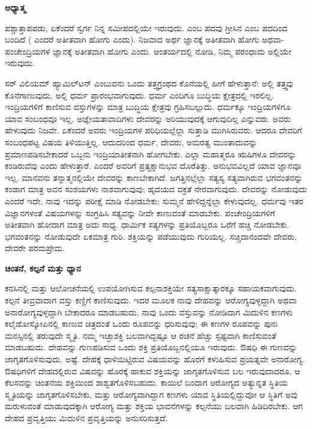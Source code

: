 \centerline{\textbf{ಅಧ್ಯಾತ್ಮ}}

ಪಶ್ಚಾತ್ತಾಪಪಡು, ಏಕೆಂದರೆ ಸ್ವರ್ಗ ನಿನ್ನ ಸಮೀಪದಲ್ಲಿಯೇ ಇರುವುದು.  ಎಂಬ ಪದವು ಗ್ರೀಸಿನ  ಎಂಬ ಪದದಿಂದ ಬಂದಿದೆ ( ಎಂದರೆ ಅತೀತವಾಗಿ ಹೋಗು ಎಂದು). ನಿಜವಾದ ಅರ್ಥ ಜ್ಞಾನಕ್ಕೆ ಅತೀತವಾಗಿ ಹೋಗು ಅಥವಾ-ಪಂಚೇಂದ್ರಿಯಗಳ ಜ್ಞಾನಕ್ಕೆ ಅತೀತವಾಗಿ ಹೋಗು ಎಂದು. ಆಂತರ್ಯದಲ್ಲಿ ನೋಡಿ, ನಿಮ್ಮ ಪರಂಧಾಮ ಅಲ್ಲಿಯೇ ಇರುವುದು.

\vskip 0.2cm

ಸರ್​ ವಿಲಿಯಮ್​ ಹ್ಯಾಮಿಲ್​ಟನ್​ ಎಂಬುವನು ಒಂದು ತತ್ತ್ವಗ್ರಂಥದ ಕೊನೆಯಲ್ಲಿ ಹೀಗೆ ಹೇಳುತ್ತಾನೆ: ಅಲ್ಲಿ ತತ್ತ್ವವು ಕೊನೆಗಾಣುವುದು, ಅಲ್ಲಿ ಧರ್ಮ ಪ್ರಾರಂಭವಾಗುವುದು. ಧರ್ಮ ಎಂದಿಗೂ ಬುದ್ಧಿಯ ಕ್ಷೇತ್ರದಲ್ಲಿ ಇರಲಿಲ್ಲ. ಇಂದ್ರಿಯಗಳಿಗೆ ಕಾಣಿಸುವ ವಸ್ತುಗಳನ್ನು ಮಾತ್ರ ಬುದ್ಧಿಯ ಕ್ಷೇತ್ರವು ಗ್ರಹಿಸಬಲ್ಲುದು. ಧರ್ಮಕ್ಕೂ ಇಂದ್ರಿಯಗಳಿಗೂ ಯಾವ ಸಂಬಂಧವೂ ಇಲ್ಲ. ಅಜ್ಞೇಯತಾವಾದಿಗಳು ದೇವರನ್ನು ಅರಿಯುವುದಕ್ಕೆ ಆಗುವುದಿಲ್ಲ ಎನ್ನುವರು. ಅವರು ಹೇಳುವುದು ನಿಜವೇ. ಏಕೆಂದರೆ ಅವರು ಇಂದ್ರಿಯಗಳ ಪರಿಧಿಯಲ್ಲೆಲ್ಲಾ ಸುತ್ತಾಡಿ ಮುಗಿಸಿರುವರು. ಆದರೂ ದೇವರಿಗೆ ಸಂಬಂಧಪಟ್ಟ ವಿಷಯ ತಿಳಿಯುತ್ತಿಲ್ಲ. ಆದುದರಿಂದ ಧರ್ಮ, ದೇವರು, ಅಮರತ್ವ ಮುಂತಾದುವನ್ನು ಪ್ರಮಾಣಪಡಿಸಬೇಕಾದರೆ ಒಬ್ಬನು ಇಂದ್ರಿಯಾತೀತನಾಗಿ ಹೋಗಬೇಕು. ಎಲ್ಲಾ ಮಹಾತ್ಮರೂ ಋಷಿಗಳೂ ದೇವರನ್ನು ಕಂಡಿರುವೆವು ಎಂದು ಹೇಳುತ್ತಾರೆ. ಎಂದರೆ ಅವರಿಗೆ ಪ್ರತ್ಯಕ್ಷಾನುಭವ ದೊರೆತಿತ್ತು. ಅನುಭವವಿಲ್ಲದೆ ಯಾವ ಜ್ಞಾನವೂ ಇಲ್ಲ. ಮಾನವನು ತನ್ನಾತ್ಮನಲ್ಲಿಯೇ ದೇವರನ್ನು ಕಾಣಬೇಕಾಗಿದೆ. ಜಗತ್ತಿನಲ್ಲೆಲ್ಲಾ ಸತ್ಯಸ್ಯ ಸತ್ಯವಾಗಿರುವ ಭಗವಂತನನ್ನು ಕಂಡಾಗ ಮಾತ್ರ ಅವನ ಸಂಶಯಗಳು ನಾಶವಾಗುವುವು; ಹೃದಯದ ವಕ್ರತೆ ನೇರವಾಗುವುದು. ದೇವರನ್ನು ನೋಡುವುದು ಎಂದರೆ ಇದೇ. ನಾವು ಇದನ್ನು ಪರೀಕ್ಷೆ ಮಾಡಿ ನೋಡಬೇಕು; ಸುಮ್ಮನೆ ಹೇಳಿದ್ದನ್ನೆಲ್ಲಾ ಕೇಳುವುದಲ್ಲ. ಧರ್ಮವು ಇತರ ವಿಜ್ಞಾನಗಳಂತೆ ವಿಷಯಗಳನ್ನು ಸಂಗ್ರಹಿಸಿ ಸತ್ಯವನ್ನು ನೀವೇ ಕಾಣುವಂತೆ ಮಾಡಬೇಕು. ಪಂಚೇಂದ್ರಿಯಗಳಿಗೆ ಅತೀತವಾಗಿ ಹೋದಾಗ ಮಾತ್ರ ಅದು ಸಾಧ್ಯ. ಧಾರ್ಮಿಕ ಸತ್ಯಗಳನ್ನು ಪ್ರತಿಯೊಬ್ಬರೂ ಒರೆಗೆ ಹಚ್ಚಿ ನೋಡಬೇಕು. ಭಗವಂತನನ್ನು ನೋಡುವುದೇ ಏಕಮಾತ್ರ ಗುರಿ. ಶಕ್ತಿಯನ್ನು ಪಡೆಯುವುದು ಗುರಿಯಲ್ಲ. ಸಚ್ಚಿದಾನಂದವೇ ದೇವರು, ದೇವರೇ ಪರಮಪ್ರೇಮ.

\centerline{\textbf{ಚಿಂತನೆ, ಕಲ್ಪನೆ ಮತ್ತು ಧ್ಯಾನ}}

ಕನಸಿನಲ್ಲಿ ಮತ್ತು ಆಲೋಚನೆಯಲ್ಲಿ ಉಪಯೋಗಿಸುವ ಕಲ್ಪನಾಶಕ್ತಿಯೇ ಸತ್ಯ\break ಸಾಕ್ಷಾತ್ಕಾರಕ್ಕೂ ಸಹಾಯಕವಾಗುವುದು. ಕಲ್ಪನೆ ತೀವ್ರವಾದಾಗ ವಸ್ತು ಕಣ್ಣಿಗೆ ಕಾಣಿಸುವುದು. ಇದರ ಮೂಲಕ ನಾವು ದೇಹವನ್ನು ಆರೋಗ್ಯವುಳ್ಳದ್ದಾಗಿ ಅಥವಾ ಅನಾರೋಗ್ಯವುಳ್ಳದ್ದಾಗಿ ಬೇಕಾದರೂ ಮಾಡಬಹುದು. ನಾವು ಒಂದು ವಸ್ತುವನ್ನು ನೋಡಿದಾಗ ಮಿದುಳಿನ ಕಣಗಳು ಕಲೈಡೋಸ್ಕೋಪಿನಲ್ಲಿ ಕಾಣುವ ಚಿತ್ರದಂತೆ ಒಂದು ರೂಪವನ್ನು ಧರಿಸುವುವು; ಈ ಕಣಗಳ ರೂಪವನ್ನು ಪುನಃ ಮನಸ್ಸಿನಲ್ಲಿ ತರುವುದೇ ಸ್ಮೃತಿ. ನಮ್ಮ ಇಚ್ಛಾಶಕ್ತಿ ಬಲವಾಗಿದ್ದಷ್ಟೂ ಆ ರಚನೆ ಹೆಚ್ಚು ಸ್ಪಷ್ಟವಾಗಿ ಕಾಣಿಸುವಂತೆ ಮಾಡಬಹುದು. ದೇಹವನ್ನು ಗುಣಪಡಿಸುವ ಒಂದು ಶಕ್ತಿ ಪ್ರತಿಯೊಬ್ಬನಲ್ಲಿಯೂ ಇರುವುದು. ಔಷಧಿ ಈ ಗುಣವನ್ನು ಜಾಗೃತಗೊಳಿಸುವುದು, ಅಷ್ಟೆ. ದೇಹಕ್ಕೆ ಧಾಳಿಯಿಟ್ಟಿರುವ ವಿಷಯವನ್ನು ಹೊರಗೆ ಕಳುಹಿಸುವ ಪ್ರಯತ್ನವೇ ಅನಾರೋಗ್ಯ. ಔಷಧಿಗಳಿಗೆ ದೇಹದಲ್ಲಿರುವ ವಿಷವನ್ನು ಹೊರಕ್ಕೆ ಹಾಕುವ ಶಕ್ತಿಯನ್ನು ಜಾಗೃತಗೊಳಿಸುವ ಬಲ ಇರುವುದಾದರೂ, ಆ ಕೆಲಸವನ್ನು ಚಿಂತನೆಯ ಶಕ್ತಿಯಿಂದ ಶಾಶ್ವತಗೊಳಿಸಬಹುದು. ಕಾಯಿಲೆ ಬಂದಾಗ ಆರೋಗ್ಯದ ಅತ್ಯುನ್ನತ ಸ್ಥಿತಿಯ ಸ್ಮೃತಿಯನ್ನು ಜಾಗೃತಗೊಳಿಸಬೇಕು, ಮತ್ತು ಆರೋಗ್ಯವಾಗಿದ್ದಾಗ ಕಣಗಳು ಯಾವ ಸ್ಥಿತಿಯಲ್ಲಿದ್ದುವೋ ಆ ಸ್ಥಿತಿಗೆ ಅವು ಮರುಳುವಂತೆ ಮಾಡುವುದಕ್ಕಾಗಿ ಆರೋಗ್ಯ ಮತ್ತು ಶಕ್ತಿಯ ಭಾವನೆಗಳನ್ನು ಕಲ್ಪನೆಯು ಬಲವಾಗಿ ಹಿಡಿದಿರಬೇಕು. ಆಗ ದೇಹದ ಪ್ರವೃತ್ತಿಯು ಮಿದುಳಿನ ಪ್ರವೃತ್ತಿಯನ್ನು ಅನುಸರಿಸುತ್ತದೆ.

